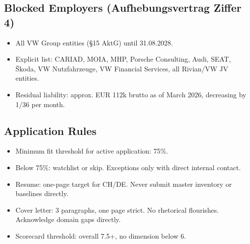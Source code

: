 \documentclass[10pt,a4paper]{article}
\begin{document}
\subsection*{Blocked Employers (Aufhebungsvertrag Ziffer 4)}
\begin{itemize}
  \item All VW Group entities (§15 AktG) until 31.08.2028.
  \item Explicit list: CARIAD, MOIA, MHP, Porsche Consulting, Audi, SEAT, Škoda,
        VW Nutzfahrzeuge, VW Financial Services, all Rivian/VW JV entities.
  \item Residual liability: approx. EUR 112k brutto as of March 2026, decreasing by 1/36 per month.
\end{itemize}

\subsection*{Application Rules}
\begin{itemize}
  \item Minimum fit threshold for active application: 75\%.
  \item Below 75\%: watchlist or skip. Exceptions only with direct internal contact.
  \item Resume: one-page target for CH/DE. Never submit master inventory or baselines directly.
  \item Cover letter: 3 paragraphs, one page strict. No rhetorical flourishes. Acknowledge domain gaps directly.
  \item Scorecard threshold: overall 7.5+, no dimension below 6.
\end{itemize}
\end{document}
